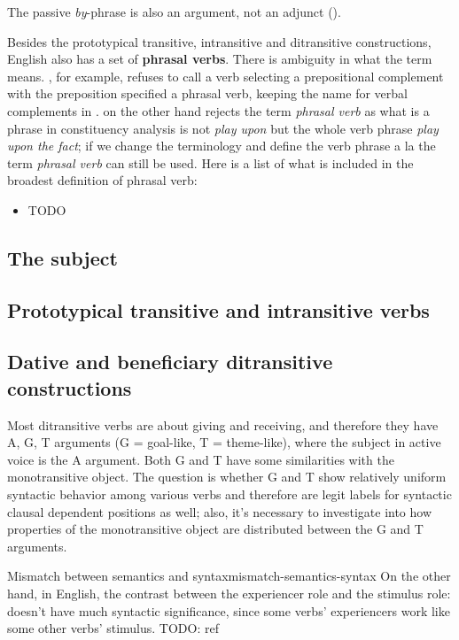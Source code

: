 \documentclass[UTF8, a4paper, oneside, scheme=plain, 12pt]{ctexbook}
\newcommand*{\citepage}[1]{p.~{#1}}
\newcommand*{\concept}[1]{\textbf{#1}}
\newcommand*{\term}[1]{\emph{#1}}
\newcommand{\form}[1]{\emph{#1}}
\begin{document}
The passive \form{by}-phrase is also an argument, not an adjunct 
().

Besides the prototypical transitive, intransitive and ditransitive constructions,
English also has a set of \concept{phrasal verbs}.
There is ambiguity in what the term means.
\citet[\citepage{289}]{dixon2005semantic}, for example,
refuses to call a verb selecting a prepositional complement with the preposition specified
a phrasal verb,
keeping the name for verbal complements in \citet{cgel}.
\citet{cgel} on the other hand rejects the term \term{phrasal verb} 
as what is a phrase in constituency analysis is not \form{play upon} 
but the whole verb phrase \form{play upon the fact};
if we change the terminology and define the verb phrase a la 
\citet[\citepage{41}]{dixon2005semantic}
the term \term{phrasal verb} can still be used.
Here is a list of what is included in the broadest definition of phrasal verb:
\begin{itemize}
    \item TODO
\end{itemize}

\subsection{The subject}\label{sec:subject}

\subsection{Prototypical transitive and intransitive verbs}



\subsection{Dative and beneficiary ditransitive constructions}

Most ditransitive verbs are about giving and receiving,
and therefore they have A, G, T arguments (G = goal-like, T = theme-like),
where the subject in active voice is the A argument.
Both G and T have some similarities with the monotransitive object. 
The question is whether G and T show relatively uniform syntactic behavior
among various verbs
and therefore are legit labels for syntactic clausal dependent positions as well;
also, it's necessary to investigate into how properties of the monotransitive object 
are distributed between the G and T arguments.

\begin{infobox}{Mismatch between semantics and syntax}{mismatch-semantics-syntax}
    On the other hand, 
    in English, the contrast between the experiencer role and the stimulus role:
    doesn't have much syntactic significance,
    since some verbs' experiencers work like some other verbs' stimulus. TODO: ref
\end{infobox}
\end{document}
